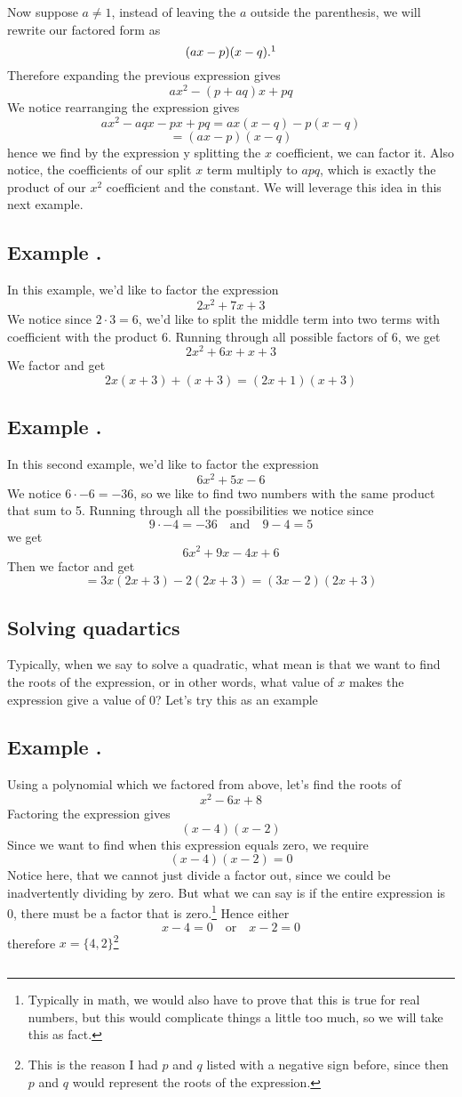 \documentclass[11pt]{article}
\numberwithin{lemma}{section}
\numberwithin{equation}{section}
\numberwithin{define}{section}
\numberwithin{prop}{section}
\numberwithin{figure}{section}
\numberwithin{theorem}{section}
\newcounter{ex}[section]
\newenvironment{ex}[0]{

	\refstepcounter{ex}
    \subsection*{Example \theex .}
    }
    {
    \subsection*{}
    }
\numberwithin{ex}{section}
\def\jand{\quad\text{and}\quad}
\def\jor{\quad\text{or}\quad}
\begin{document}
Now suppose $a\neq1$, instead of leaving the $a$ outside the parenthesis, we will rewrite our factored form as
$$(ax-p)(x-q).\footnotemark$$
Therefore expanding the previous expression gives
$$ax^2-(p+aq)x+pq$$
We notice rearranging the expression gives
$$ax^2-aqx-px+pq=ax(x-q)-p(x-q)$$
$$=(ax-p)(x-q)$$
hence we find by the expression y splitting the $x$ coefficient, we can factor it. 
Also notice, the coefficients of our split $x$ term multiply to $apq$, which is exactly the product of our $x^2$ coefficient and the constant. We will leverage this idea in this next example.

\begin{ex}
	\label{ex:1st_sm}
	In this example, we'd like to factor the expression
	$$2x^2+7x+3$$
	We notice since $2\cdot 3=6$, we'd like to split the middle term into two terms with coefficient with the product $6$. Running through all possible factors of $6$, we get
	$$2x^2+6x+x+3$$
	We factor and get
	$$2x(x+3)+(x+3)=(2x+1)(x+3)$$
\end{ex}

\begin{ex}
	In this second example, we'd like to factor the expression
	$$6x^2+5x-6$$
	We notice $6\cdot -6=-36$, so we like to find two numbers with the same product that sum to 5. Running through all the possibilities we notice since $$9\cdot -4=-36\jand 9-4=5$$
	we get
	$$6x^2+9x-4x+6$$
	Then we factor and get
	$$=3x(2x+3)-2(2x+3)=(3x-2)(2x+3)$$
\end{ex}

\subsection{Solving quadartics}
Typically, when we say to solve a quadratic, what mean is that we want to find the roots of the expression, or in other words, what value of $x$ makes the expression give a value of 0? Let's try this as an example

\begin{ex}
	Using a polynomial which we factored from above, let's find the roots of
	$$x^2-6x+8$$
	Factoring the expression gives
	$$(x-4)(x-2)$$
	Since we want to find when this expression equals zero, we require
	$$(x-4)(x-2)=0$$
	Notice here, that we cannot just divide a factor out, since we could be inadvertently dividing by zero. 
	But what we can say is if the entire expression is 0, there must be a factor that is zero.\footnote{
	Typically in math, we would also have to prove that this is true for real numbers, but this would complicate things a little too much, so we will take this as fact.}
	Hence either
	$$x-4=0 \jor x-2=0$$
	therefore $x=\{4,2\}$\footnote{
	This is the reason I had $p$ and $q$ listed with a negative sign before, since then $p$ and $q$ would represent the roots of the expression.}
\end{ex}
\end{document}
